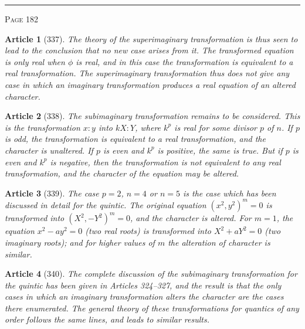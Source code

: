 \documentclass[11pt,a4paper]{article}
\theoremstyle{cayley}
\newtheorem{art}{Article}
\begin{document}
\vspace{1em}
\noindent\rule{\textwidth}{0.4pt}
\begin{center}\textsc{Page 182}\end{center}
\newpage

\begin{art}[337]
The theory of the superimaginary transformation is thus seen to lead to the conclusion that no new case arises from it. The transformed equation is only real when $\phi$ is real, and in this case the transformation is equivalent to a real transformation. The superimaginary transformation thus does not give any case in which an imaginary transformation produces a real equation of an altered character.
\end{art}

\begin{art}[338]
The subimaginary transformation remains to be considered. This is the transformation $x:y$ into $kX:Y$, where $k^p$ is real for some divisor $p$ of $n$. If $p$ is odd, the transformation is equivalent to a real transformation, and the character is unaltered. If $p$ is even and $k^p$ is positive, the same is true. But if $p$ is even and $k^p$ is negative, then the transformation is not equivalent to any real transformation, and the character of the equation may be altered.
\end{art}

\begin{art}[339]
The case $p=2$, $n=4$ or $n=5$ is the case which has been discussed in detail for the quintic. The original equation $(x^2, y^2)^m = 0$ is transformed into $(X^2, -Y^2)^m = 0$, and the character is altered. For $m=1$, the equation $x^2 - ay^2 = 0$ (two real roots) is transformed into $X^2 + aY^2 = 0$ (two imaginary roots); and for higher values of $m$ the alteration of character is similar.
\end{art}

\begin{art}[340]
The complete discussion of the subimaginary transformation for the quintic has been given in Articles 324--327, and the result is that the only cases in which an imaginary transformation alters the character are the cases there enumerated. The general theory of these transformations for quantics of any order follows the same lines, and leads to similar results.
\end{art}
\end{document}
